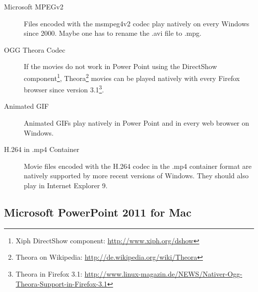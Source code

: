 \begin{description}
\item[Microsoft MPEGv2]  Files encoded with the msmpeg4v2  codec play natively
on every Windows since 2000. Maybe one has to rename the .avi file to .mpg.


\item[OGG Theora  Codec] If the  movies do not  work in Power Point  using the
DirectShow         component\footnote{Xiph        DirectShow        component:
\url{http://www.xiph.org/dshow}},    Theora\footnote{Theora    on   Wikipedia:
\url{http://de.wikipedia.org/wiki/Theora}} movies can  be played natively with
every  Firefox  browser  since  version 3.1\footnote{Theora  in  Firefox  3.1:
\url{http://www.linux-magazin.de/NEWS/Nativer-Ogg-Theora-Support-in-Firefox-3.1}}.

\item[Animated GIF]  Animated GIFs play natively  in Power Point  and in every
web browser on Windows.

\item[H.264 in .mp4 Container] Movie files encoded with the H.264 codec in the
.mp4  container format  are  natively  supported by  more  recent versions  of
Windows. They should also play in Internet Explorer 9.
\end{description}


\subsection{Microsoft PowerPoint 2011 for Mac}

